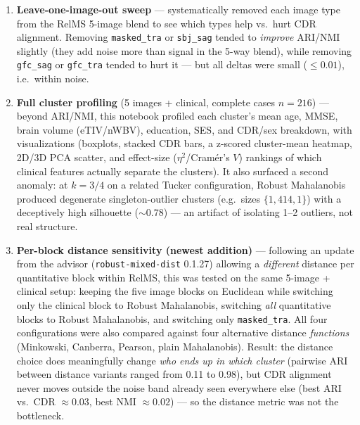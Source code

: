\documentclass[11pt]{article}
\newcommand{\code}[1]{\texttt{#1}}
\begin{document}
\begin{enumerate}[leftmargin=1.4em, itemsep=0.4em]
  \item \textbf{Leave-one-image-out sweep} --- systematically removed each image type from the
  RelMS 5-image blend to see which types help vs.\ hurt CDR alignment. Removing \code{masked\_tra}
  or \code{sbj\_sag} tended to \emph{improve} ARI/NMI slightly (they add noise more than signal in
  the 5-way blend), while removing \code{gfc\_sag} or \code{gfc\_tra} tended to hurt it --- but all
  deltas were small ($\leq 0.01$), i.e.\ within noise.

  \item \textbf{Full cluster profiling} (5 images + clinical, complete cases $n=216$) --- beyond
  ARI/NMI, this notebook profiled each cluster's mean age, MMSE, brain volume (eTIV/nWBV),
  education, SES, and CDR/sex breakdown, with visualizations (boxplots, stacked CDR bars, a
  z-scored cluster-mean heatmap, 2D/3D PCA scatter, and effect-size ($\eta^2$/Cram\'er's $V$)
  rankings of which clinical features actually separate the clusters). It also surfaced a second
  anomaly: at $k=3/4$ on a related Tucker configuration, Robust Mahalanobis produced degenerate
  singleton-outlier clusters (e.g.\ sizes $\{1, 414, 1\}$) with a deceptively high silhouette
  ($\sim 0.78$) --- an artifact of isolating 1--2 outliers, not real structure.

  \item \textbf{Per-block distance sensitivity (newest addition)} --- following an update from the
  advisor (\code{robust-mixed-dist} 0.1.27) allowing a \emph{different} distance per quantitative
  block within RelMS, this was tested on the same 5-image + clinical setup: keeping the five image
  blocks on Euclidean while switching only the clinical block to Robust Mahalanobis, switching
  \emph{all} quantitative blocks to Robust Mahalanobis, and switching only \code{masked\_tra}. All
  four configurations were also compared against four alternative distance \emph{functions}
  (Minkowski, Canberra, Pearson, plain Mahalanobis). Result: the distance choice does meaningfully
  change \emph{who ends up in which cluster} (pairwise ARI between distance variants ranged from
  0.11 to 0.98), but CDR alignment never moves outside the noise band already seen everywhere else
  (best ARI vs.\ CDR $\approx 0.03$, best NMI $\approx 0.02$) --- so the distance metric was not the
  bottleneck.
\end{enumerate}
\end{document}
